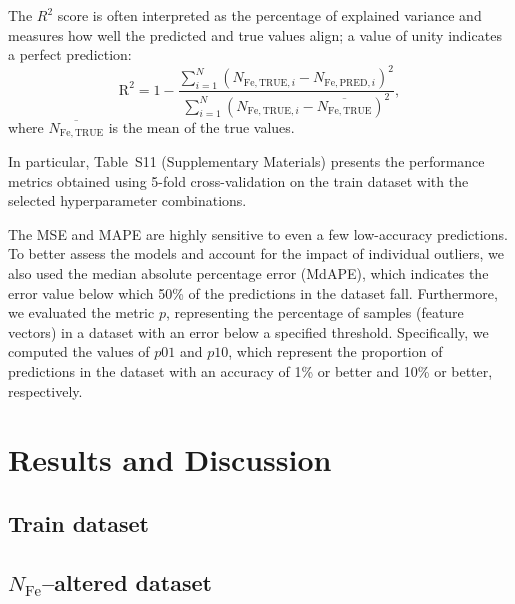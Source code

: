 \documentclass[a4paper,fleqn]{cas-sc}
\begin{document}
The $R^2$ score is often interpreted as the percentage of explained variance 
and measures how well the predicted and true values align; a value of unity indicates a perfect prediction:
\begin{equation}
\label{eq5}
    \mathrm{R}^2 = 1-\frac{\displaystyle\sum_{i=1}^{N} (N_{\mathrm{Fe,TRUE},i}-N_{\mathrm{Fe,PRED},i})^2}
    {\displaystyle\sum_{i=1}^{N} (N_{\mathrm{Fe,TRUE},i}-\overline{N_\mathrm{Fe,TRUE}})^2},
\end{equation}
where $\overline{N_\mathrm{Fe,TRUE}}$ is the mean of the true values.

In particular, Table~S11 (Supplementary Materials) presents the performance metrics obtained 
using 5-fold cross-validation on the train dataset with the selected hyperparameter combinations.


The MSE and MAPE are highly sensitive to even a few low-accuracy predictions.
To better assess the models and account for the impact of individual outliers, we also used the median absolute percentage error (MdAPE), 
which indicates the error value below which 50\% of the predictions in the dataset fall.
Furthermore, we evaluated the metric $p$, representing the percentage of samples (feature vectors) in a dataset with an error below a specified threshold.
Specifically, we computed the values of $p01$ and $p10$, 
which represent the proportion of predictions in the dataset with an accuracy of 1\% 
or better and 10\% or better, respectively.



\section{Results and Discussion}

\subsection{Train dataset}

\subsection{$N_\mathrm{Fe}$--altered dataset}
\end{document}

